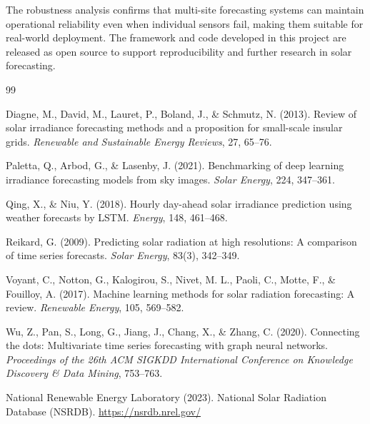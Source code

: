 \documentclass[11pt,a4paper]{article}
\begin{document}
The robustness analysis confirms that multi-site forecasting systems can maintain operational reliability even when individual sensors fail, making them suitable for real-world deployment. The framework and code developed in this project are released as open source to support reproducibility and further research in solar forecasting.

\newpage

\begin{thebibliography}{99}

Diagne, M., David, M., Lauret, P., Boland, J., \& Schmutz, N. (2013).
Review of solar irradiance forecasting methods and a proposition for small-scale insular grids.
\textit{Renewable and Sustainable Energy Reviews}, 27, 65--76.

Paletta, Q., Arbod, G., \& Lasenby, J. (2021).
Benchmarking of deep learning irradiance forecasting models from sky images.
\textit{Solar Energy}, 224, 347--361.

Qing, X., \& Niu, Y. (2018).
Hourly day-ahead solar irradiance prediction using weather forecasts by LSTM.
\textit{Energy}, 148, 461--468.

Reikard, G. (2009).
Predicting solar radiation at high resolutions: A comparison of time series forecasts.
\textit{Solar Energy}, 83(3), 342--349.

Voyant, C., Notton, G., Kalogirou, S., Nivet, M. L., Paoli, C., Motte, F., \& Fouilloy, A. (2017).
Machine learning methods for solar radiation forecasting: A review.
\textit{Renewable Energy}, 105, 569--582.

Wu, Z., Pan, S., Long, G., Jiang, J., Chang, X., \& Zhang, C. (2020).
Connecting the dots: Multivariate time series forecasting with graph neural networks.
\textit{Proceedings of the 26th ACM SIGKDD International Conference on Knowledge Discovery \& Data Mining}, 753--763.

National Renewable Energy Laboratory (2023).
National Solar Radiation Database (NSRDB).
\url{https://nsrdb.nrel.gov/}

\end{thebibliography}
\end{document}
